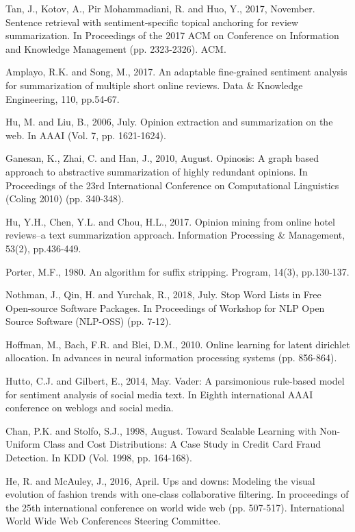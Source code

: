 \documentclass[letterpaper]{article}
\begin{document}
\begin{thebibliography}{}
Tan, J., Kotov, A., Pir Mohammadiani, R. and Huo, Y., 2017, November. Sentence retrieval with sentiment-specific topical anchoring for review summarization. In Proceedings of the 2017 ACM on Conference on Information and Knowledge Management (pp. 2323-2326). ACM.


Amplayo, R.K. and Song, M., 2017. An adaptable fine-grained sentiment analysis for summarization of multiple short online reviews. Data \& Knowledge Engineering, 110, pp.54-67.

Hu, M. and Liu, B., 2006, July. Opinion extraction and summarization on the web. In AAAI (Vol. 7, pp. 1621-1624).


Ganesan, K., Zhai, C. and Han, J., 2010, August. Opinosis: A graph based approach to abstractive summarization of highly redundant opinions. In Proceedings of the 23rd International Conference on Computational Linguistics (Coling 2010) (pp. 340-348).


Hu, Y.H., Chen, Y.L. and Chou, H.L., 2017. Opinion mining from online hotel reviews–a text summarization approach. Information Processing \& Management, 53(2), pp.436-449.


Porter, M.F., 1980. An algorithm for suffix stripping. Program, 14(3), pp.130-137.

Nothman, J., Qin, H. and Yurchak, R., 2018, July. Stop Word Lists in Free Open-source Software Packages. In Proceedings of Workshop for NLP Open Source Software (NLP-OSS) (pp. 7-12).

Hoffman, M., Bach, F.R. and Blei, D.M., 2010. Online learning for latent dirichlet allocation. In advances in neural information processing systems (pp. 856-864).

Hutto, C.J. and Gilbert, E., 2014, May. Vader: A parsimonious rule-based model for sentiment analysis of social media text. In Eighth international AAAI conference on weblogs and social media.

Chan, P.K. and Stolfo, S.J., 1998, August. Toward Scalable Learning with Non-Uniform Class and Cost Distributions: A Case Study in Credit Card Fraud Detection. In KDD (Vol. 1998, pp. 164-168).

He, R. and McAuley, J., 2016, April. Ups and downs: Modeling the visual evolution of fashion trends with one-class collaborative filtering. In proceedings of the 25th international conference on world wide web (pp. 507-517). International World Wide Web Conferences Steering Committee.


\end{thebibliography}
\end{document}
